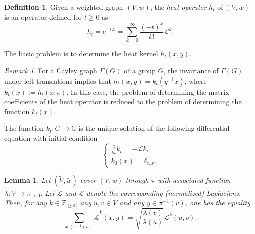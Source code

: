 \documentclass[11pt]{amsart}
\newcommand{\Z}{\mathbb{Z}}
\newcommand{\C}{\mathbb{C}}
\newcommand{\R}{\mathbb{R}}
\theoremstyle{definition}
\newtheorem{definition}{Definition}
\theoremstyle{remark}
\newtheorem{remark}{Remark}
\theoremstyle{plain}
\newtheorem{lemma}{Lemma}
\numberwithin{equation}{section}
\numberwithin{lemma}{section}
\numberwithin{definition}{section}
\numberwithin{proposition}{section}
\numberwithin{corollary}{section}
\numberwithin{theorem}{section}
\numberwithin{remark}{section}
\begin{document}
\begin{definition}\label{ht}
 Given a weighted graph $(V,w)$, the \textit{heat operator} $h_t$ of $(V,w)$ is an operator defined for $t\geq 0$ as 
 $$
 h_t=e^{-t\mathcal{L}}=\sum_{k=0}^{\infty}\frac{(-t)^k}{k!}\mathcal{L}^k.
 $$
\end{definition}
The basic problem is to determine the heat kernel $h_t(x,y)$.
\begin{remark}
For a Cayley graph $\Gamma(G)$ of a group $G$, the invariance of $\Gamma(G)$ under left translations implies that $h_t(x,y)=k_t(y^{-1}x)$, where $k_t(x):=h_t(x,e)$. In this case, the problem of determining the matrix coefficients of the heat operator is reduced to the problem of determining the function $k_t(x)$.

 The function $k_t\colon G\to\C$ 
is the unique solution of the following differential equation with initial condition
\begin{equation}\label{hk}
 \begin{cases} 
      \frac{\partial}{\partial{t}}k_t=-\mathcal{L}k_t \\
      k_0(x)=\delta_{e,x}.
\end{cases}
\end{equation}
\end{remark}

\begin{lemma}\label{norm_lapk_cov}
 Let $(\tilde{V},\tilde{w})$ cover $(V,w)$ through $\pi$ with associated function $\lambda: V \to \R_{>0}$. Let $\tilde{\mathcal{L}}$ and $\mathcal{L}$ denote the corresponding (normalized) Laplacians.
 Then, for any $k\in\Z_{\ge0}$, any $u,v\in V$ and any $y\in\pi^{-1}(v)$, one has the equality
 \begin{equation}\label{norm_lapk_cov_rel}
\sum_{x\in\pi^{-1}(u)}\tilde{\mathcal{L}}^k(x,y)=\sqrt{\frac{\lambda(v)}{\lambda(u)}}\mathcal{L}^k(u,v).
\end{equation}
\end{lemma}
\end{document}
